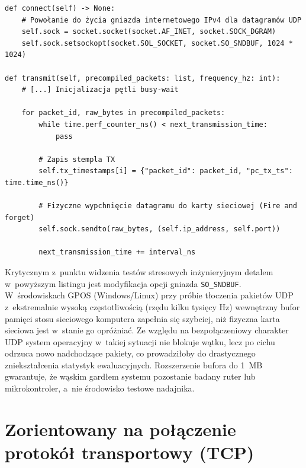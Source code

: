 \begin{listing}[htbp]
    \caption{Konfiguracja bezpołączeniowego gniazda UDP z~rozszerzonym systemowym buforem nadawczym (\texttt{udp\_dp.py}) \cite{espy_nexus_python_host}.}
    \label{lst:python_udp}
    \begin{verbatim}
def connect(self) -> None:
    # Powołanie do życia gniazda internetowego IPv4 dla datagramów UDP
    self.sock = socket.socket(socket.AF_INET, socket.SOCK_DGRAM)
    self.sock.setsockopt(socket.SOL_SOCKET, socket.SO_SNDBUF, 1024 * 1024)

def transmit(self, precompiled_packets: list, frequency_hz: int):
    # [...] Inicjalizacja pętli busy-wait

    for packet_id, raw_bytes in precompiled_packets:
        while time.perf_counter_ns() < next_transmission_time:
            pass
            
        # Zapis stempla TX
        self.tx_timestamps[i] = {"packet_id": packet_id, "pc_tx_ts": time.time_ns()}
        
        # Fizyczne wypchnięcie datagramu do karty sieciowej (Fire and forget)
        self.sock.sendto(raw_bytes, (self.ip_address, self.port))
        
        next_transmission_time += interval_ns
\end{verbatim}
\end{listing}

Krytycznym z~punktu widzenia testów stresowych inżynieryjnym detalem w~powyższym listingu jest modyfikacja opcji gniazda \texttt{SO\_SNDBUF}.
W~środowiskach GPOS (Windows/Linux) przy próbie tłoczenia pakietów UDP z~ekstremalnie wysoką częstotliwością (rzędu kilku tysięcy Hz) wewnętrzny bufor pamięci stosu sieciowego komputera zapełnia się szybciej, niż fizyczna karta sieciowa jest w~stanie go opróżniać.
Ze względu na bezpołączeniowy charakter UDP system operacyjny w~takiej sytuacji nie blokuje wątku, lecz po cichu odrzuca nowo nadchodzące pakiety, co prowadziłoby do drastycznego zniekształcenia statystyk ewaluacyjnych.
Rozszerzenie bufora do 1~MB gwarantuje, że wąskim gardłem systemu pozostanie badany ruter lub mikrokontroler, a~nie środowisko testowe nadajnika.

\section{Zorientowany na połączenie protokół transportowy (TCP)}
\label{sec:protokol_tcp}

